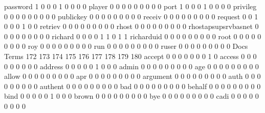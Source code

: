 \documentclass[compress,8pt]{beamer}
\begin{document}
\begin{frame}
\begin{Schunk}
  password                                   1   0   0   0   1   0   0   0   0
  player                                     0   0   0   0   0   0   0   0   0
  port                                       1   0   0   0   1   0   0   0   0
  privileg                                   0   0   0   0   0   0   0   0   0
  publickey                                  0   0   0   0   0   0   0   0   0
  receiv                                     0   0   0   0   0   0   0   0   0
  request                                    0   0   1   0   0   0   1   0   0
  retriev                                    0   0   0   0   0   0   0   0   0
  rhost                                      0   0   0   0   0   0   0   0   0
  rhostapsupsrvbasnet                        0   0   0   0   0   0   0   0   0
  richard                                    0   0   0   0   1   1   0   1   1
  richarduid                                 0   0   0   0   0   0   0   0   0
  root                                       0   0   0   0   0   0   0   0   0
  roy                                        0   0   0   0   0   0   0   0   0
  run                                        0   0   0   0   0   0   0   0   0
  ruser                                      0   0   0   0   0   0   0   0   0
                                          Docs
Terms                                      172 173 174 175 176 177 178 179 180
  accept                                     0   0   0   0   0   0   0   1   0
  access                                     0   0   0   0   0   0   0   0   0
  address                                    0   0   0   0   0   1   0   0   0
  admin                                      0   0   0   0   0   0   0   0   0
  age                                        0   0   0   0   0   0   0   0   0
  allow                                      0   0   0   0   0   0   0   0   0
  apr                                        0   0   0   0   0   0   0   0   0
  argument                                   0   0   0   0   0   0   0   0   0
  auth                                       0   0   0   0   0   0   0   0   0
  authent                                    0   0   0   0   0   0   0   0   0
  bad                                        0   0   0   0   0   0   0   0   0
  behalf                                     0   0   0   0   0   0   0   0   0
  bind                                       0   0   0   0   0   1   0   0   0
  brown                                      0   0   0   0   0   0   0   0   0
  bye                                        0   0   0   0   0   0   0   0   0
  cadi                                       0   0   0   0   0   0   0   0   0

\end{Schunk}
\end{frame}
\end{document}
